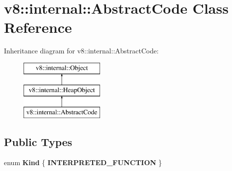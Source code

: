 \hypertarget{classv8_1_1internal_1_1_abstract_code}{}\section{v8\+:\+:internal\+:\+:Abstract\+Code Class Reference}
\label{classv8_1_1internal_1_1_abstract_code}
Inheritance diagram for v8\+:\+:internal\+:\+:Abstract\+Code\+:\begin{figure}[H]
\begin{center}
\leavevmode
\includegraphics[height=3.000000cm]{classv8_1_1internal_1_1_abstract_code}
\end{center}
\end{figure}
\subsection*{Public Types}
\begin{DoxyCompactItemize}
\item 
enum {\bfseries Kind} \{ {\bfseries I\+N\+T\+E\+R\+P\+R\+E\+T\+E\+D\+\_\+\+F\+U\+N\+C\+T\+I\+ON}
 \}\hypertarget{classv8_1_1internal_1_1_abstract_code_a915d9a221d696e00492c45273de7d7c0}{}\label{classv8_1_1internal_1_1_abstract_code_a915d9a221d696e00492c45273de7d7c0}

\end{DoxyCompactItemize}
